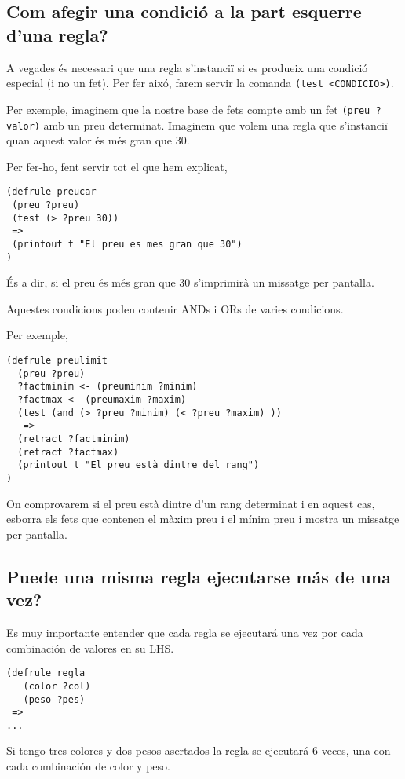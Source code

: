 \documentclass[11pt,svgnames]{scrbook}
\begin{document}
\subsection{Com afegir una condició a la part esquerre d'una regla?}


A vegades és necessari que una regla s'instanciï si es produeix una condició especial (i no un fet).
Per fer aixó, farem servir la comanda \texttt{(test <CONDICIO>)}.

Per exemple, imaginem que la nostre base de fets compte amb un fet \texttt{(preu
?valor)} amb un preu determinat. Imaginem que volem una regla que s'instanciï
quan aquest valor és més gran que 30.

Per fer-ho, fent servir tot el que hem explicat,

\begin{verbatim}
(defrule preucar
 (preu ?preu)
 (test (> ?preu 30))
 =>
 (printout t "El preu es mes gran que 30")
)
\end{verbatim}

És a dir, si el preu és més gran que 30 s'imprimirà un missatge per pantalla.

Aquestes condicions poden contenir ANDs i ORs de varies condicions.

Per exemple,

\begin{verbatim}
(defrule preulimit
  (preu ?preu)
  ?factminim <- (preuminim ?minim)
  ?factmax <- (preumaxim ?maxim)
  (test (and (> ?preu ?minim) (< ?preu ?maxim) ))
   =>
  (retract ?factminim)
  (retract ?factmax)
  (printout t "El preu està dintre del rang")
) \end{verbatim}

On comprovarem si el preu està dintre d'un rang determinat i en aquest cas, esborra els fets que contenen el màxim preu i el mínim preu i mostra un missatge per pantalla.


\subsection{Puede una misma regla ejecutarse más de una vez?}

Es muy importante entender que cada regla se ejecutará una vez por cada
combinación de valores en su LHS.


\begin{verbatim}
(defrule regla 
   (color ?col)
   (peso ?pes)
 =>
...
\end{verbatim} 

Si tengo tres colores y dos pesos asertados la regla se ejecutará 6 veces, una
con cada combinación de color y peso. 
\end{document}
